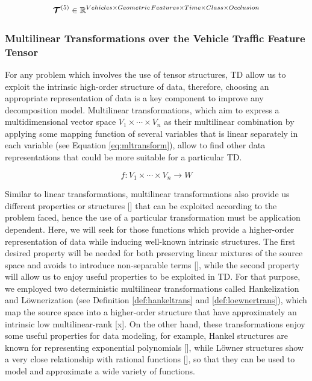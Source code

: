 \documentclass[sensors,article,submit,moreauthors,pdftex]{Definitions/mdpi}
\newcommand{\mathten}[1]{\boldsymbol{\mathbf{\mathcal{\MakeUppercase{#1}}}}}
\begin{document}
\begin{equation}
\mathten{T}^{(5)} \in \mathbb{R}^{Vehicles \times Geometric\,Features \times Time \times Class \times Occlusion}
\label{eq:vtf5model}
\end{equation}

\subsubsection{Multilinear Transformations over the Vehicle Traffic Feature Tensor}
For any problem which involves the use of tensor structures, TD allow us to  exploit the intrinsic high-order structure of data, therefore, choosing an appropriate representation of data is a key component to improve any decomposition model. Multilinear transformations, which aim to express a multidimensional vector space $V_1 \times \cdots \times V_n$ as their multilinear combination by applying some mapping function of several variables that is linear separately in each variable (see Equation \ref{eq:mltransform}), allow to find other data representations that could be more suitable for a particular TD.


\begin{equation}
f : V_1 \times \cdots \times V_n \rightarrow W
\label{eq:mltransform}
\end{equation}

Similar to linear transformations, multilinear transformations also provide us different properties or structures [] that can be exploited according to the problem faced, hence the use of a particular transformation must be application dependent. Here, we will seek for those functions which provide a higher-order representation of data while inducing well-known intrinsic structures. The first desired property will be needed for both preserving linear mixtures of the source space and avoids to introduce non-separable terms [], while the second property will allow us to enjoy useful properties to be exploited in TD. For that purpose, we employed two deterministic multilinear transformations called Hankelization and L{\"o}wnerization (see Definition \ref{def:hankeltrans} and \ref{def:loewnertrans}), which map the source space into a higher-order structure that have approximately an intrinsic low multilinear-rank [x]. On the other hand, these transformations enjoy some useful properties for data modeling, for example, Hankel structures are known for representing exponential polynomials [], while L{\"o}wner structures show a very close relationship with rational functions [], so that they can be used to model and approximate a wide variety of functions.
	
\end{document}
